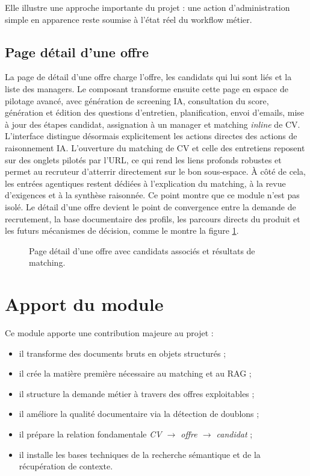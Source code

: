 Elle illustre une approche importante du projet : une action d'administration simple en apparence reste soumise à l'état réel du workflow métier.

\subsection{Page détail d'une offre}
La page de détail d'une offre charge l'offre, les candidats qui lui sont liés et la liste des managers. Le composant  transforme ensuite cette page en espace de pilotage avancé, avec génération de screening IA, consultation du score, génération et édition des questions d'entretien, planification, envoi d'emails, mise à jour des étapes candidat, assignation à un manager et matching \textit{inline} de CV.
L'interface distingue désormais explicitement les actions directes des actions de raisonnement IA. L'ouverture du matching de CV et celle des entretiens reposent sur des onglets pilotés par l'URL, ce qui rend les liens profonds robustes et permet au recruteur d'atterrir directement sur le bon sous-espace. À côté de cela, les entrées agentiques restent dédiées à l'explication du matching, à la revue d'exigences et à la synthèse raisonnée.
Ce point montre que ce module n'est pas isolé. Le détail d'une offre devient le point de convergence entre la demande de recrutement, la base documentaire des profils, les parcours directs du produit et les futurs mécanismes de décision, comme le montre la figure \ref{fig:job-cv-matching}.

\begin{figure}[H]
  \centering
  \caption{\label{fig:job-cv-matching}Page détail d'une offre avec candidats associés et résultats de matching.}
\end{figure}

\section{Apport du module}
Ce module apporte une contribution majeure au projet :
\begin{itemize}
  \item il transforme des documents bruts en objets structurés ;
  \item il crée la matière première nécessaire au matching et au RAG ;
  \item il structure la demande métier à travers des offres exploitables ;
  \item il améliore la qualité documentaire via la détection de doublons ;
  \item il prépare la relation fondamentale \textit{CV $\rightarrow$ offre $\rightarrow$ candidat} ;
  \item il installe les bases techniques de la recherche sémantique et de la récupération de contexte.
\end{itemize}

